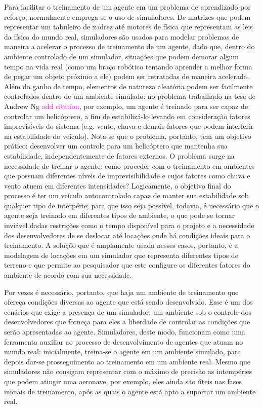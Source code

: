 \documentclass[cic,tc]{iiufrgs}
\newcommand\bruno[1]{\textcolor{magenta}{#1}}
\begin{document}
Para facilitar o treinamento de um agente em um problema de aprendizado por
reforço, normalmente emprega-se o uso de simuladores. De matrizes que podem
representar um tabuleiro de xadrez até motores de física que representam as
leis da física do mundo real, simuladores são usados para modelar problemas de
maneira a acelerar o processo de treinamento de um agente, dado que, dentro do
ambiente controlado de um simulador, situações que podem demorar algum tempo na
vida real (como um braço robótico tentando aprender a melhor forma de pegar um
objeto próximo a ele) podem ser retratadas de maneira acelerada. Além do ganho
de tempo, elementos de natureza aleatória podem ser facilmente controlados
dentro de um ambiente simulado: no problema trabalhado na tese de Andrew Ng
\bruno{add citation}, por exemplo, um agente é treinado para ser capaz de
controlar um helicóptero, a fim de estabilizá-lo levando em consideração fatores
imprevisíveis do sistema (e.g. vento, chuva e demais fatores que podem
interferir na estabilidade do veículo). Nota-se que o problema, portanto, tem um
objetivo prático: desenvolver um controle para um helicóptero que mantenha sua
estabilidade, independentemente de fatores externos. O problema surge na
necessidade de treinar o agente: como proceder com o treinamento em ambientes
que possuam diferentes níveis de imprevisibilidade e cujos fatores como chuva
e vento atuem em diferentes intensidades? Logicamente, o objetivo final do
processo é ter um veículo autocontrolado capaz de manter sua estabilidade sob
qualquer tipo de interpérie; para que isso seja possível, todavia, é necessário
que o agente seja treinado em diferentes tipos de ambiente, o que pode se tornar
inviável dadas restrições como o tempo disponível para o projeto e a necessidade dos
desenvolvedores de se deslocar até locações onde há condições ideais para o
treinamento. A solução que é amplamente usada nesses casos, portanto, é a
modelagem de locações em um simulador que representa diferentes tipos de terreno
e que permite ao pesquisador que este configure os diferentes
fatores do ambiente de acordo com sua necessidade.


Por vezes é necessário, portanto, que haja um ambiente de treinamento que ofereça
condições diversas ao agente que está sendo desenvolvido. Esse é um dos cenários
que exige a presença de um simulador: um ambiente sob o controle dos
desenvolvedores que forneça para eles a liberdade de controlar as condições que
serão apresentadas ao agente. Simuladores, deste modo, funcionam como uma
ferramenta auxiliar ao processo de desenvolvimento de agentes que atuam no mundo
real: inicialmente, treina-se o agente
em um ambiente simulado, para depois dar-se prosseguimento ao treinamento em um
ambiente
real. Mesmo que simuladores não consigam representar com o máximo de precisão
as intempéries que podem atingir uma aeronave, por exemplo, eles ainda são úteis
nas fases iniciais de treinamento, após as quais o agente está apto a suportar
um ambiente real.
\end{document}
